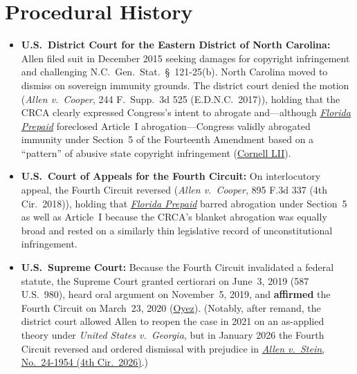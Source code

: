 \documentclass[12pt]{article}
\begin{document}
\section{Procedural History}
\begin{itemize}
  \item \textbf{U.S.\ District Court for the Eastern District of North Carolina:} Allen filed suit in December 2015 seeking damages for copyright infringement and challenging N.C.\ Gen.\ Stat.\ \S~121-25(b). North Carolina moved to dismiss on sovereign immunity grounds. The district court denied the motion (\textit{Allen v.\ Cooper}, 244 F.\ Supp.\ 3d 525 (E.D.N.C.\ 2017)), holding that the CRCA clearly expressed Congress's intent to abrogate and---although \href{https://supreme.justia.com/cases/federal/us/527/627/}{\textit{Florida Prepaid}} foreclosed Article~I abrogation---Congress validly abrogated immunity under Section~5 of the Fourteenth Amendment based on a ``pattern'' of abusive state copyright infringement (\href{https://www.law.cornell.edu/supremecourt/text/18-877}{Cornell LII}).
  \item \textbf{U.S.\ Court of Appeals for the Fourth Circuit:} On interlocutory appeal, the Fourth Circuit reversed (\textit{Allen v.\ Cooper}, 895 F.3d 337 (4th Cir.\ 2018)), holding that \href{https://supreme.justia.com/cases/federal/us/527/627/}{\textit{Florida Prepaid}} barred abrogation under Section~5 as well as Article~I because the CRCA's blanket abrogation was equally broad and rested on a similarly thin legislative record of unconstitutional infringement.
  \item \textbf{U.S.\ Supreme Court:} Because the Fourth Circuit invalidated a federal statute, the Supreme Court granted certiorari on June~3, 2019 (587 U.S.\ 980), heard oral argument on November~5, 2019, and \textbf{affirmed} the Fourth Circuit on March~23, 2020 (\href{https://www.oyez.org/cases/2019/18-877}{Oyez}). (Notably, after remand, the district court allowed Allen to reopen the case in 2021 on an as-applied theory under \textit{United States v.\ Georgia}, but in January 2026 the Fourth Circuit reversed and ordered dismissal with prejudice in \href{https://law.justia.com/cases/federal/appellate-courts/ca4/24-1954/24-1954-2026-01-23.html}{\textit{Allen v.\ Stein}, No.\ 24-1954 (4th Cir.\ 2026)}.)
\end{itemize}
\end{document}
